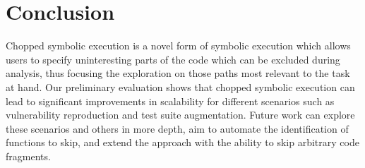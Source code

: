 
\chapter{Conclusion}\label{chapter:conclusion}

Chopped symbolic execution is a novel form of symbolic execution which
allows users to specify uninteresting parts of the code which can be
excluded during analysis, thus focusing the exploration on those paths
most relevant to the task at hand.  Our preliminary evaluation shows
that chopped symbolic execution can lead to significant improvements
in scalability for different scenarios such as vulnerability
reproduction and test suite augmentation.  Future work
can explore these scenarios and others in more depth, aim to automate
the identification of functions to skip, and extend the approach with
the ability to skip arbitrary code fragments.
